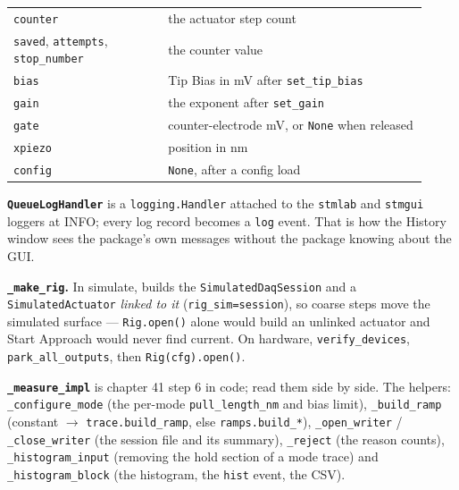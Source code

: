 \begin{longtable}{@{}>{\raggedright\arraybackslash}p{0.34\linewidth}>{\raggedright\arraybackslash}p{0.58\linewidth}@{}}
\texttt{counter} & the actuator step count \\
\texttt{saved}, \texttt{attempts}, \texttt{stop\_\discretionary{}{}{}number} & the counter value \\
\texttt{bias} & Tip Bias in mV after \texttt{set\_\discretionary{}{}{}tip\_\discretionary{}{}{}bias} \\
\texttt{gain} & the exponent after \texttt{set\_\discretionary{}{}{}gain} \\
\texttt{gate} & counter-electrode mV, or \texttt{None} when released \\
\texttt{xpiezo} & position in nm \\
\texttt{config} & \texttt{None}, after a config load \\
\bottomrule
\end{longtable}
\normalsize

\textbf{\texttt{Queue\discretionary{}{}{}Log\discretionary{}{}{}Handler}} is a \texttt{logging.\discretionary{}{}{}Handler} attached to the \texttt{stmlab} and \texttt{stmgui} loggers at INFO; every log record becomes a \texttt{log} event. That is how the History window sees the package's own messages without the package knowing about the GUI.

\textbf{\texttt{\_\discretionary{}{}{}make\_\discretionary{}{}{}rig}.} In simulate, builds the \texttt{Simulated\discretionary{}{}{}Daq\discretionary{}{}{}Session} and a \texttt{Simulated\discretionary{}{}{}Actuator} \emph{linked to it} (\texttt{rig\_\discretionary{}{}{}sim=session}), so coarse steps move the simulated surface --- \texttt{Rig.\discretionary{}{}{}open()} alone would build an unlinked actuator and Start Approach would never find current. On hardware, \texttt{verify\_\discretionary{}{}{}devices}, \texttt{park\_\discretionary{}{}{}all\_\discretionary{}{}{}outputs}, then \texttt{Rig(cfg).\discretionary{}{}{}open()}.

\textbf{\texttt{\_\discretionary{}{}{}measure\_\discretionary{}{}{}impl}} is chapter 41 step 6 in code; read them side by side. The helpers: \texttt{\_\discretionary{}{}{}configure\_\discretionary{}{}{}mode} (the per-mode \texttt{pull\_\discretionary{}{}{}length\_\discretionary{}{}{}nm} and bias limit), \texttt{\_\discretionary{}{}{}build\_\discretionary{}{}{}ramp} (constant $\rightarrow$ \texttt{trace.\discretionary{}{}{}build\_\discretionary{}{}{}ramp}, else \texttt{ramps.\discretionary{}{}{}build\_\discretionary{}{}{}*}), \texttt{\_\discretionary{}{}{}open\_\discretionary{}{}{}writer} / \texttt{\_\discretionary{}{}{}close\_\discretionary{}{}{}writer} (the session file and its summary), \texttt{\_\discretionary{}{}{}reject} (the reason counts), \texttt{\_\discretionary{}{}{}histogram\_\discretionary{}{}{}input} (removing the hold section of a mode trace) and \texttt{\_\discretionary{}{}{}histogram\_\discretionary{}{}{}block} (the histogram, the \texttt{hist} event, the CSV).

